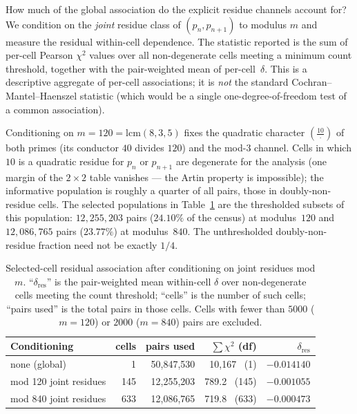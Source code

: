 \documentclass[11pt]{amsart}
\theoremstyle{definition}
\newcommand{\Lsym}[2]{\left(\tfrac{#1}{#2}\right)}
\begin{document}
How much of the global association do the explicit residue channels
account for? We condition on the \emph{joint} residue class of
$(p_n, p_{n+1})$ to modulus $m$ and measure the residual within-cell
dependence. The statistic reported is the sum of per-cell Pearson $\chi^2$
values over all non-degenerate cells meeting a minimum count threshold,
together with the pair-weighted mean of per-cell~$\delta$. This is a
descriptive aggregate of per-cell associations; it is \emph{not} the standard
Cochran--Mantel--Haenszel statistic (which would be a single one-degree-of-freedom
test of a common association).

Conditioning on $m = 120 = \mathrm{lcm}(8,3,5)$ fixes the quadratic character
$\Lsym{10}{\cdot}$ of both primes (its conductor $40$ divides $120$) and the
mod-$3$ channel. Cells in which $10$ is a quadratic residue for $p_n$ or
$p_{n+1}$ are degenerate for the analysis (one margin of the $2\times2$ table
vanishes --- the Artin property is impossible); the informative population is
roughly a quarter of all pairs, those in doubly-non-residue cells. The
selected populations in Table~\ref{tab:decomp} are the thresholded subsets of
this population: $12{,}255{,}203$ pairs ($24.10\%$ of the census) at
modulus~$120$ and $12{,}086{,}765$ pairs ($23.77\%$) at modulus~$840$. The
unthresholded doubly-non-residue fraction need not be exactly $1/4$.

\begin{table}[ht]
	\centering
	\caption{Selected-cell residual association after conditioning on joint residues
		mod $m$.
		``$\delta_{\mathrm{res}}$'' is the pair-weighted mean within-cell $\delta$
		over non-degenerate cells meeting the count threshold;
		``cells'' is the number of such cells; ``pairs used'' is the total pairs
		in those cells. Cells with fewer than $5000$ ($m = 120$) or $2000$ ($m = 840$)
		pairs are excluded.}
	\label{tab:decomp}
	\begin{tabular}{lrrrr}
		\toprule
		Conditioning           & cells & pairs used     & $\sum \chi^2$ (df) & $\delta_{\mathrm{res}}$ \\
		\midrule
		none (global)          & 1     & 50{,}847{,}530 & 10{,}167 \ (1)     & $-0.014140$             \\
		mod 120 joint residues & 145   & 12{,}255{,}203 & 789.2 \ (145)      & $-0.001055$             \\
		mod 840 joint residues & 633   & 12{,}086{,}765 & 719.8 \ (633)      & $-0.000473$             \\
		\bottomrule
	\end{tabular}
\end{table}
\end{document}
